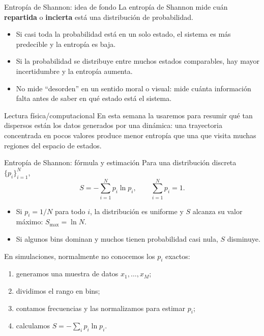 \begin{frame}{Entropía de Shannon: idea de fondo}
La entropía de Shannon mide cuán \textbf{repartida} o \textbf{incierta} está una distribución de probabilidad.

\begin{itemize}
    \item Si casi toda la probabilidad está en un solo estado, el sistema es más predecible y la entropía es baja.
    \item Si la probabilidad se distribuye entre muchos estados comparables, hay mayor incertidumbre y la entropía aumenta.
    \item No mide ``desorden'' en un sentido moral o visual: mide cuánta información falta antes de saber en qué estado está el sistema.
\end{itemize}

\begin{block}{Lectura física/computacional}
En esta semana la usaremos para resumir qué tan dispersos están los datos generados por una dinámica: una trayectoria concentrada en pocos valores produce menor entropía que una que visita muchas regiones del espacio de estados.
\end{block}
\end{frame}

\begin{frame}{Entropía de Shannon: fórmula y estimación}
Para una distribución discreta $\{p_i\}_{i=1}^N$,
\begin{equation*}
    S = -\sum_{i=1}^{N} p_i \ln p_i,
    \qquad
    \sum_{i=1}^{N} p_i = 1.
\end{equation*}

\begin{itemize}
    \item Si $p_i=1/N$ para todo $i$, la distribución es uniforme y $S$ alcanza su valor máximo: $S_{\max}=\ln N$.
    \item Si algunos bins dominan y muchos tienen probabilidad casi nula, $S$ disminuye.
\end{itemize}

\vspace{0.15cm}
En simulaciones, normalmente no conocemos los $p_i$ exactos:
\begin{enumerate}
    \item generamos una muestra de datos $x_1,\dots,x_M$;
    \item dividimos el rango en bins;
    \item contamos frecuencias y las normalizamos para estimar $p_i$;
    \item calculamos $S = -\sum_i p_i \ln p_i$.
\end{enumerate}
\end{frame}

